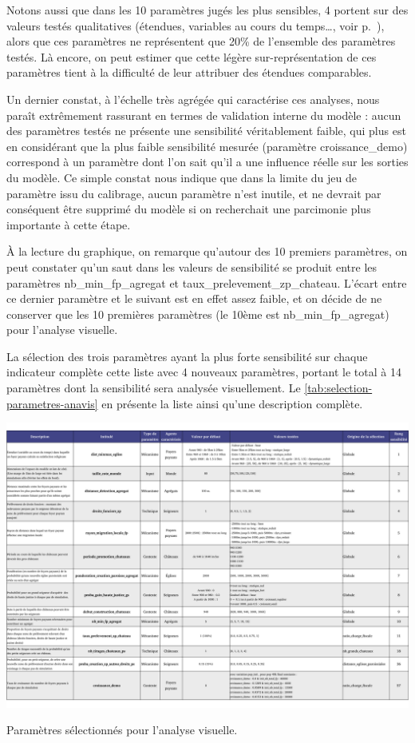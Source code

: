 Notons aussi que dans les 10 paramètres jugés les plus sensibles, 4 portent sur des valeurs testés \og qualitatives\fg{} (étendues, variables au cours du temps\ldots, voir p.~\pageref{par:etendue-parametres}), alors que ces paramètres ne représentent que 20\% de l'ensemble des paramètres testés.
Là encore, on peut estimer que cette légère sur-représentation de ces paramètres tient à la difficulté de leur attribuer des étendues comparables.

Un dernier constat, à l'échelle très agrégée qui caractérise ces analyses, nous paraît extrêmement rassurant en termes de validation interne du modèle : aucun des paramètres testés ne présente une sensibilité véritablement faible, qui plus est en considérant que la plus faible sensibilité mesurée (paramètre \textsf{croissance\_demo}) correspond à un paramètre dont l'on sait qu'il a une influence réelle sur les sorties du modèle.
Ce simple constat nous indique que dans la limite du jeu de paramètre issu du calibrage, aucun paramètre n'est inutile, et ne devrait par conséquent être supprimé du modèle si on recherchait une parcimonie plus importante à cette étape.



À la lecture du graphique, on remarque qu'autour des 10 premiers paramètres, on peut constater qu'un \og saut\fg{} dans les valeurs de sensibilité se produit entre les paramètres \textsf{nb\_min\_fp\_agregat} et \textsf{taux\_prelevement\_zp\_chateau}.
L'écart entre ce dernier paramètre et le suivant est en effet assez faible, et on décide de ne conserver que les 10 premières paramètres (le 10ème est \textsf{nb\_min\_fp\_agregat}) pour l'analyse visuelle.

La sélection des trois paramètres ayant la plus forte sensibilité sur chaque indicateur complète cette liste avec 4 nouveaux paramètres, portant le total à 14 paramètres dont la sensibilité sera analysée visuellement.
Le \cref{tab:selection-parametres-anavis} en présente la liste ainsi qu'une description complète.

\clearpage
\begin{table}[H]
\includegraphics[width=1.75\linewidth, angle=90, origin=c]{img/Parametres.pdf}
\caption{Paramètres sélectionnés pour l'analyse visuelle.}
\label{tab:selection-parametres-anavis}
\end{table}

